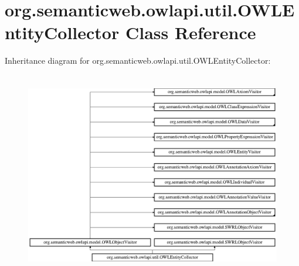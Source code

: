 \hypertarget{classorg_1_1semanticweb_1_1owlapi_1_1util_1_1_o_w_l_entity_collector}{\section{org.\-semanticweb.\-owlapi.\-util.\-O\-W\-L\-Entity\-Collector Class Reference}
\label{classorg_1_1semanticweb_1_1owlapi_1_1util_1_1_o_w_l_entity_collector}
}
Inheritance diagram for org.\-semanticweb.\-owlapi.\-util.\-O\-W\-L\-Entity\-Collector\-:\begin{figure}[H]
\begin{center}
\leavevmode
\includegraphics[height=9.056604cm]{classorg_1_1semanticweb_1_1owlapi_1_1util_1_1_o_w_l_entity_collector}
\end{center}
\end{figure}
